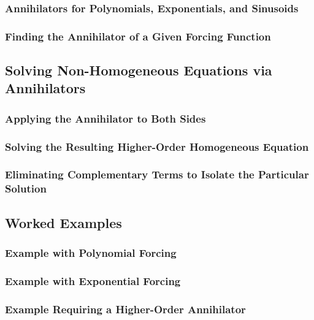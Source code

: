 \documentclass[10pt]{article}
\begin{document}
    \subsubsection{Annihilators for Polynomials, Exponentials, and Sinusoids}
    \subsubsection{Finding the Annihilator of a Given Forcing Function}

\subsection{Solving Non-Homogeneous Equations via Annihilators}
    \subsubsection{Applying the Annihilator to Both Sides}
    \subsubsection{Solving the Resulting Higher-Order Homogeneous Equation}
    \subsubsection{Eliminating Complementary Terms to Isolate the Particular Solution}

\subsection{Worked Examples}
    \subsubsection{Example with Polynomial Forcing}
    \subsubsection{Example with Exponential Forcing}
    \subsubsection{Example Requiring a Higher-Order Annihilator}
\end{document}
